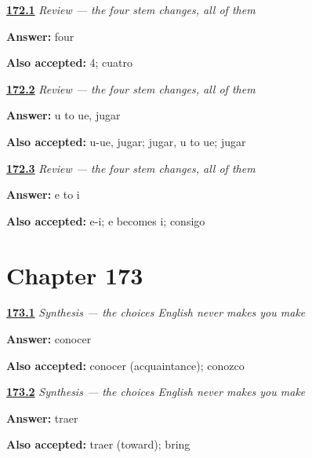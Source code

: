 \noindent\begin{minipage}[t]{\linewidth}
\raggedright
\hyperlink{review-ES-C39-repaso-cambios-count}{\textbf{172.1}} \emph{Review — the four stem changes, all of them}\par
\small \textbf{Answer:} four\par
\footnotesize \textbf{Also accepted:} 4; cuatro
\end{minipage}\par\medskip

\noindent\begin{minipage}[t]{\linewidth}
\raggedright
\hyperlink{review-ES-C39-repaso-cambios-only}{\textbf{172.2}} \emph{Review — the four stem changes, all of them}\par
\small \textbf{Answer:} u to ue, jugar\par
\footnotesize \textbf{Also accepted:} u-ue, jugar; jugar, u to ue; jugar
\end{minipage}\par\medskip

\noindent\begin{minipage}[t]{\linewidth}
\raggedright
\hyperlink{review-ES-C39-repaso-cambios-ei}{\textbf{172.3}} \emph{Review — the four stem changes, all of them}\par
\small \textbf{Answer:} e to i\par
\footnotesize \textbf{Also accepted:} e-i; e becomes i; consigo
\end{minipage}\par\medskip

\section*{Chapter 173}

\noindent\begin{minipage}[t]{\linewidth}
\raggedright
\hyperlink{review-ES-C39-sintesis-elegir-know}{\textbf{173.1}} \emph{Synthesis — the choices English never makes you make}\par
\small \textbf{Answer:} conocer\par
\footnotesize \textbf{Also accepted:} conocer (acquaintance); conozco
\end{minipage}\par\medskip

\noindent\begin{minipage}[t]{\linewidth}
\raggedright
\hyperlink{review-ES-C39-sintesis-elegir-bring}{\textbf{173.2}} \emph{Synthesis — the choices English never makes you make}\par
\small \textbf{Answer:} traer\par
\footnotesize \textbf{Also accepted:} traer (toward); bring
\end{minipage}\par\medskip

